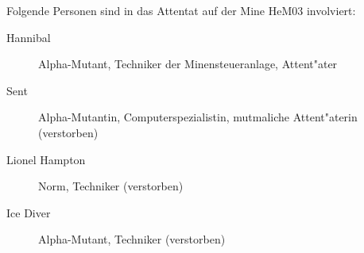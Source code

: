
Folgende Personen sind in das Attentat auf der Mine HeM03 involviert:

\begin{description}
    \item[Hannibal] Alpha-Mutant, Techniker der Minensteueranlage, Attent"ater
    \item[Sent] Alpha-Mutantin, Computerspezialistin, mutma\3liche Attent"aterin (verstorben)
    \item[Lionel Hampton] Norm, Techniker (verstorben)
    \item[Ice Diver] Alpha-Mutant, Techniker (verstorben)
\end{description}
